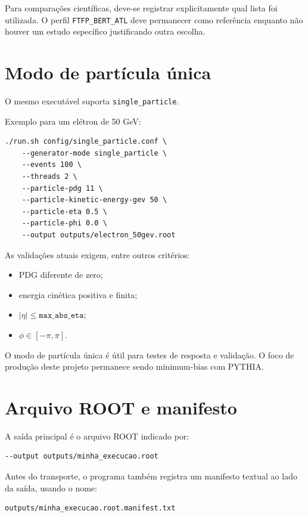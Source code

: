\documentclass[11pt,a4paper]{article}
\begin{document}
Para comparações científicas, deve-se registrar explicitamente qual lista foi
utilizada. O perfil \texttt{FTFP\_BERT\_ATL} deve permanecer como referência
enquanto não houver um estudo específico justificando outra escolha.

\section{Modo de partícula única}

O mesmo executável suporta \texttt{single\_particle}.

Exemplo para um elétron de 50 GeV:

\begin{lstlisting}[style=shell]
./run.sh config/single_particle.conf \
    --generator-mode single_particle \
    --events 100 \
    --threads 2 \
    --particle-pdg 11 \
    --particle-kinetic-energy-gev 50 \
    --particle-eta 0.5 \
    --particle-phi 0.0 \
    --output outputs/electron_50gev.root
\end{lstlisting}

As validações atuais exigem, entre outros critérios:

\begin{itemize}
  \item PDG diferente de zero;
  \item energia cinética positiva e finita;
  \item \(\lvert\eta\rvert \leq \texttt{max\_abs\_eta}\);
  \item \(\phi \in [-\pi,\pi]\).
\end{itemize}

O modo de partícula única é útil para testes de resposta e validação. O foco de
produção deste projeto permanece sendo minimum-bias com PYTHIA.

\section{Arquivo ROOT e manifesto}

A saída principal é o arquivo ROOT indicado por:

\begin{lstlisting}[style=shell]
--output outputs/minha_execucao.root
\end{lstlisting}

Antes do transporte, o programa também registra um manifesto textual ao lado da
saída, usando o nome:

\begin{lstlisting}[style=shell]
outputs/minha_execucao.root.manifest.txt
\end{lstlisting}
\end{document}
